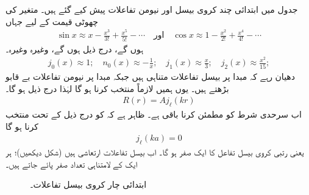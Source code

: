جدول  میں ابتدائی چند کروی بیسل اور نیومن تفاعلات پیش کیے گئے ہیں۔ متغیر  کی چھوٹی قیمت کے لیے جہاں
\begin{align*}
\sin x\approx x-\frac{x^{3}}{3!}+\frac{x^{5}}{5!}-\dotsb\quad \text{اور}\quad \cos x \approx 1-\frac{x^{2}}{2!}+\frac{x^{4}}{4!}-\dotsb
\end{align*}
 ہوں گے، درج ذیل ہوں گے، وغیرہ وغیرہ۔
\begin{align*}
j_{0}(x)\approx1;\quad{n_{0}(x)\approx-\frac{1}{x}};\quad{j_{1}(x)\approx\frac{x}{3}};\quad{j_{2}(x)\approx\frac{x^{2}}{15}}; 
\end{align*}
 دھیان رہے کہ مبدا پر بیسل تفاعلات متناہی ہیں جبکہ مبدا پر نیومن تفاعلات بے قابو بڑھتے ہیں۔ یوں ہمیں لازماً  منتخب کرنا ہو گا لہٰذا درج ذیل ہو گا۔
\begin{align}
R(r)=Aj_{\ell}(kr) 
\end{align}
اب سرحدی شرط  کو مطمئن کرنا باقی ہے۔ ظاہر ہے کہ  کو درج ذیل کے تحت منتخب کرنا ہو گا
\begin{align}
j_{\ell}(ka)=0
\end{align}
یعنی  رتبی کروی بیسل تفاعل کا  ایک صفر ہو گا۔ اب بیسل تفاعلات ارتعاشی ہیں (شکل  دیکھیں)؛ ہر ایک کے لامتناہی تعداد صفر پائے جاتے ہیں۔
\begin{figure}
\centering
{}
\caption{ابتدائی چار کروی بیسل تفاعلات۔}
\label{شکل_تین_ابعادی_چار_کروی_بیسل_تفاعلات}
\end{figure}




